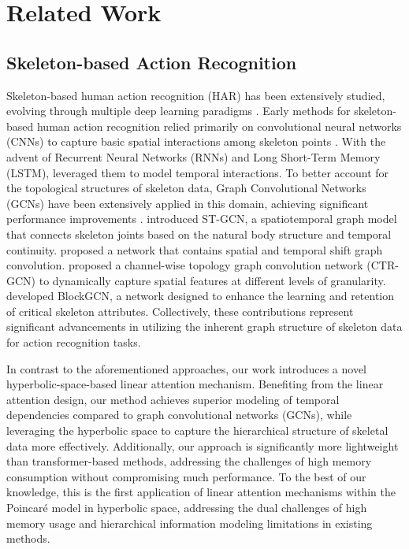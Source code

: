 \section{Related Work}
\subsection{Skeleton-based Action Recognition}
Skeleton-based human action recognition (HAR) has been extensively studied, evolving through multiple deep learning paradigms \citep{du2015skeleton,wang2018action,li2017joint,li2017adaptive,li2017skeleton}. Early methods for skeleton-based human action recognition relied primarily on convolutional neural networks (CNNs) to capture basic spatial interactions among skeleton points  \citep{du2015skeleton}. With the advent of Recurrent Neural Networks (RNNs) and Long Short-Term Memory (LSTM),  \citep{li2017adaptive,li2017skeleton} leveraged them to model temporal interactions. To better account for the topological structures of skeleton data, Graph Convolutional Networks (GCNs) have been extensively applied in this domain, achieving significant performance improvements  \citep{yan2018spatial,cheng2020skeleton,chen2021channel,zhou2024blockgcn}.  \citep{yan2018spatial} introduced ST-GCN, a spatiotemporal graph model that connects skeleton joints based on the natural body structure and temporal continuity.   \citep{cheng2020skeleton} proposed a network that contains spatial and temporal shift graph convolution.  \citep{chen2021channel} proposed a channel-wise topology graph convolution network (CTR-GCN) to dynamically capture spatial features at different levels of granularity.  \citep{zhou2024blockgcn} developed BlockGCN, a network designed to enhance the learning and retention of critical skeleton attributes. Collectively, these contributions represent significant advancements in utilizing the inherent graph structure of skeleton data for action recognition tasks. 

In contrast to the aforementioned approaches, our work introduces a novel hyperbolic-space-based linear attention mechanism. Benefiting from the linear attention design, our method achieves superior modeling of temporal dependencies compared to graph convolutional networks (GCNs), while leveraging the hyperbolic space to capture the hierarchical structure of skeletal data more effectively. Additionally, our approach is significantly more lightweight than transformer-based methods, addressing the challenges of high memory consumption without compromising much performance. To the best of our knowledge, this is the first application of linear attention mechanisms within the Poincaré model in hyperbolic space, addressing the dual challenges of high memory usage and hierarchical information modeling limitations in existing methods. 

